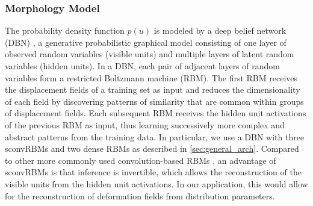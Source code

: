 \subsubsection{Morphology Model}

The probability density function $p(u)$ is modeled by a deep belief network
(DBN) \citep{hinton2006b}, a generative probabilistic graphical model consisting
of one layer of observed random variables (visible units) and multiple layers of
latent random variables (hidden units). In a DBN, each pair of adjacent layers
of random variables form a restricted Boltzmann machine (RBM). The first RBM
receives the displacement fields of a training set as input and reduces the
dimensionality of each field by discovering patterns of similarity that are
common within groups of displacement fields. Each subsequent RBM receives the
hidden unit activations of the previous RBM as input, thus learning successively
more complex and abstract patterns from the training data. In particular, we use
a DBN with three sconvRBMs and two dense RBMs as described in
\ref{sec:general_arch}. Compared to other more commonly used convolution-based
RBMs \cite{lee2009}, an advantage of sconvRBMs is that inference is invertible,
which allows the reconstruction of the visible units from the hidden unit
activations. In our application, this would allow for the reconstruction of
deformation fields from distribution parameters.

